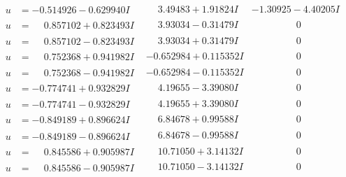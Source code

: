 \documentclass[1p]{elsarticle_modified}
\theoremstyle{definition}
\begin{document}
$$\begin{array}{c|c|c}
\begin{aligned}
u &= -0.514926 - 0.629940 I\end{aligned}
 & \phantom{-}3.49483 + 1.91824 I & -1.30925 - 4.40205 I \\ \hline\begin{aligned}
u &= \phantom{-}0.857102 + 0.823493 I\end{aligned}
 & \phantom{-}3.93034 - 0.31479 I & \phantom{-0.000000 } 0 \\ \hline\begin{aligned}
u &= \phantom{-}0.857102 - 0.823493 I\end{aligned}
 & \phantom{-}3.93034 + 0.31479 I & \phantom{-0.000000 } 0 \\ \hline\begin{aligned}
u &= \phantom{-}0.752368 + 0.941982 I\end{aligned}
 & -0.652984 + 0.115352 I & \phantom{-0.000000 } 0 \\ \hline\begin{aligned}
u &= \phantom{-}0.752368 - 0.941982 I\end{aligned}
 & -0.652984 - 0.115352 I & \phantom{-0.000000 } 0 \\ \hline\begin{aligned}
u &= -0.774741 + 0.932829 I\end{aligned}
 & \phantom{-}4.19655 - 3.39080 I & \phantom{-0.000000 } 0 \\ \hline\begin{aligned}
u &= -0.774741 - 0.932829 I\end{aligned}
 & \phantom{-}4.19655 + 3.39080 I & \phantom{-0.000000 } 0 \\ \hline\begin{aligned}
u &= -0.849189 + 0.896624 I\end{aligned}
 & \phantom{-}6.84678 + 0.99588 I & \phantom{-0.000000 } 0 \\ \hline\begin{aligned}
u &= -0.849189 - 0.896624 I\end{aligned}
 & \phantom{-}6.84678 - 0.99588 I & \phantom{-0.000000 } 0 \\ \hline\begin{aligned}
u &= \phantom{-}0.845586 + 0.905987 I\end{aligned}
 & \phantom{-}10.71050 + 3.14132 I & \phantom{-0.000000 } 0 \\ \hline\begin{aligned}
u &= \phantom{-}0.845586 - 0.905987 I\end{aligned}
 & \phantom{-}10.71050 - 3.14132 I & \phantom{-0.000000 } 0 \\ \hline\begin{aligned}

\end{aligned}
\end{array}$$
\end{document}
